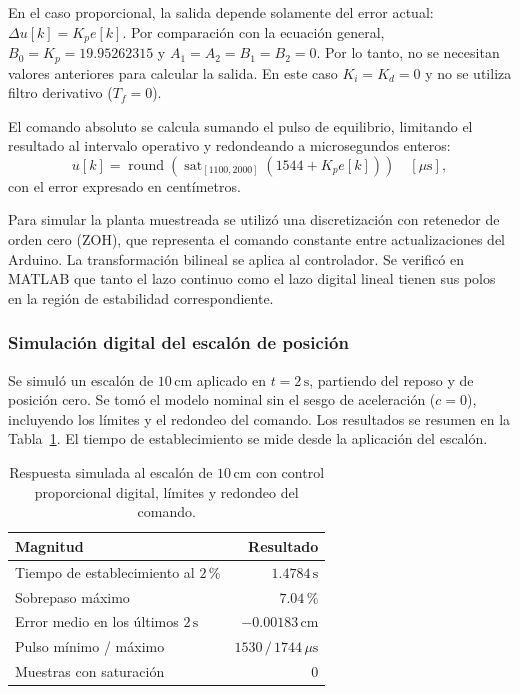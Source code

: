 \documentclass[a4paper, twoside, 10pt, spanish]{article}
\numberwithin{table}{section}
\begin{document}
    En el caso proporcional, la salida depende solamente del error actual: $\Delta u[k]=K_pe[k]$. Por comparación con la ecuación general, $B_0=K_p=19.95262315$ y $A_1=A_2=B_1=B_2=0$. Por lo tanto, no se necesitan valores anteriores para calcular la salida. En este caso $K_i=K_d=0$ y no se utiliza filtro derivativo ($T_f=0$).

    El comando absoluto se calcula sumando el pulso de equilibrio, limitando el resultado al intervalo operativo y redondeando a microsegundos enteros:
    \[
        u[k]=\operatorname{round}\!\left(
        \operatorname{sat}_{[1100,2000]}\left(1544+K_p e[k]\right)\right)
        \quad [\mu\text{s}],
    \]
    con el error expresado en centímetros.

    Para simular la planta muestreada se utilizó una discretización con retenedor de orden cero (ZOH), que representa el comando constante entre actualizaciones del Arduino. La transformación bilineal se aplica al controlador. Se verificó en MATLAB que tanto el lazo continuo como el lazo digital lineal tienen sus polos en la región de estabilidad correspondiente.

    \subsubsection{Simulación digital del escalón de posición}
    Se simuló un escalón de $10\,\text{cm}$ aplicado en $t=2\,\text{s}$, partiendo del reposo y de posición cero. Se tomó el modelo nominal sin el sesgo de aceleración ($c=0$), incluyendo los límites y el redondeo del comando. Los resultados se resumen en la Tabla~\ref{tab:p_escalon_simulado}. El tiempo de establecimiento se mide desde la aplicación del escalón.

    \begin{table}[H]
        \centering
        \caption{Respuesta simulada al escalón de $10\,\text{cm}$ con control proporcional digital, límites y redondeo del comando.}
        \label{tab:p_escalon_simulado}
        \begin{tabular}{lr}
            \toprule
            Magnitud & Resultado \\
            \midrule
            Tiempo de establecimiento al $2\,\%$ & $1.4784\,\text{s}$ \\
            Sobrepaso máximo & $7.04\,\%$ \\
            Error medio en los últimos $2\,\text{s}$ & $-0.00183\,\text{cm}$ \\
            Pulso mínimo / máximo & $1530\,/\,1744\,\mu\text{s}$ \\
            Muestras con saturación & $0$ \\
            \bottomrule
        \end{tabular}
    \end{table}
\end{document}
